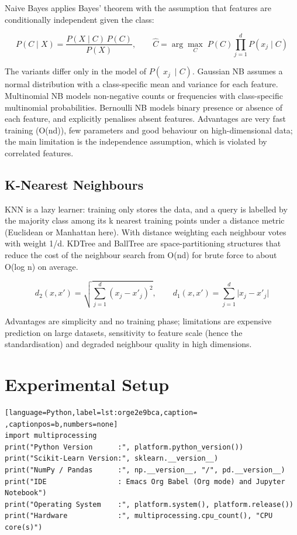 \documentclass[11pt]{article}
\begin{document}
Naive Bayes applies Bayes' theorem with the assumption that features are conditionally
independent given the class:

\begin{equation}
P(C \mid X) = \frac{P(X \mid C)\,P(C)}{P(X)}, \qquad
\hat{C} = \arg\max_{C}\; P(C)\prod_{j=1}^{d} P(x_j \mid C)
\end{equation}

The variants differ only in the model of \(P(~x_j~ \mid C)\). Gaussian NB assumes a normal
distribution with a class-specific mean and variance for each feature. Multinomial NB models
non-negative counts or frequencies with class-specific multinomial probabilities. Bernoulli
NB models binary presence or absence of each feature, and explicitly penalises absent
features. Advantages are very fast training (O(nd)), few parameters and good behaviour on
high-dimensional data; the main limitation is the independence assumption, which is violated
by correlated features.

\subsection*{K-Nearest Neighbours}
\label{sec:org56584fa}


KNN is a lazy learner: training only stores the data, and a query is labelled by the
majority class among its k nearest training points under a distance metric (Euclidean or
Manhattan here). With distance weighting each neighbour votes with weight 1/d. KDTree and
BallTree are space-partitioning structures that reduce the cost of the neighbour search from
O(nd) for brute force to about O(log n) on average.

\begin{equation}
d_{2}(x,x') = \sqrt{\sum_{j=1}^{d}(x_j-x'_j)^2}, \qquad
d_{1}(x,x') = \sum_{j=1}^{d}\lvert x_j-x'_j\rvert
\end{equation}

Advantages are simplicity and no training phase; limitations are expensive prediction on
large datasets, sensitivity to feature scale (hence the standardisation) and degraded
neighbour quality in high dimensions.

\section*{Experimental Setup}
\label{sec:orgd7976c0}

\begin{lstlisting}[language=Python,label=lst:orge2e9bca,caption= ,captionpos=b,numbers=none]
import multiprocessing
print("Python Version      :", platform.python_version())
print("Scikit-Learn Version:", sklearn.__version__)
print("NumPy / Pandas      :", np.__version__, "/", pd.__version__)
print("IDE                 : Emacs Org Babel (Org mode) and Jupyter Notebook")
print("Operating System    :", platform.system(), platform.release())
print("Hardware            :", multiprocessing.cpu_count(), "CPU core(s)")
\end{lstlisting}
\end{document}
